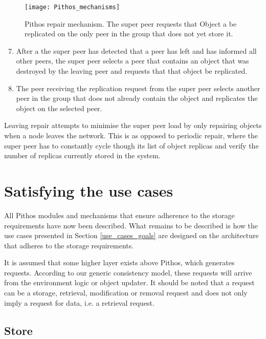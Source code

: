 \begin{figure}[htbp]
 \centering
 \texttt{[image: Pithos\_mechanisms]}
 \caption{Pithos repair mechanism. The super peer requests that Object a be replicated on the only peer in the group that does not yet store it.}
 \label{fig_pithos_repair}
\end{figure}
%
\begin{enumerate}
\setcounter{enumi}{6}
\item After a the super peer has detected that a peer has left and has informed all other peers, the super peer selects a peer that contains an object that was destroyed by the leaving peer and requests that that object be replicated.

\item The peer receiving the replication request from the super peer selects another peer in the group that does not already contain the object and replicates the object on the selected peer.
\end{enumerate}

Leaving repair attempts to minimise the super peer load by only repairing objects when a node leaves the network. This is as opposed to periodic repair, where the super peer has to constantly cycle though its list of object replicas and verify the number of replicas currently stored in the system.

\section{Satisfying the use cases}
All Pithos modules and mechanisms that ensure adherence to the storage requirements have now been described. What remains to be described is how the use cases presented in Section \ref{use_cases_goals} are designed on the architecture that adheres to the storage requirements.

It is assumed that some higher layer exists above Pithos, which generates requests. According to our generic consistency model, these requests will arrive from the environment logic or object updater. It should be noted that a request can be a storage, retrieval, modification or removal request and does not only imply a request for data, i.e. a retrieval request.

\subsection{Store}
\label{pithos_store}

